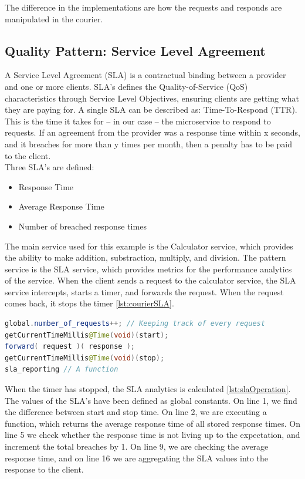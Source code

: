 \documentclass[12pt]{article}
\begin{document}
The difference in the implementations are how the requests and responds are manipulated in the courier.

\subsection{Quality Pattern: Service Level Agreement}
A Service Level Agreement (SLA) \cite{SLA:1} is a contractual binding between a provider and one or more clients. SLA's defines the Quality-of-Service (QoS) \cite{QoS:1} characteristics through Service Level Objectives, ensuring clients are getting what they are paying for. A single SLA can be described as: Time-To-Respond (TTR). This is the time it takes for -- in our case -- the microservice to respond to requests. If an agreement from the provider was a response time within x seconds, and it breaches for more than y times per month, then a penalty has to be paid to the client. \\

Three SLA's are defined:
\begin{itemize}
    \item Response Time
    \item Average Response Time
    \item Number of breached response times
\end{itemize}

The main service used for this example is the Calculator service, which provides the ability to make addition, substraction, multiply, and division. The pattern service is the SLA service, which provides metrics for the performance analytics of the service. When the client sends a request to the calculator service, the SLA service intercepts, starts a timer, and forwards the request. When the request comes back, it stops the timer \ref{lst:courierSLA}. 

\begin{lstlisting}[caption=Courier operations for the SLA service, 
captionpos=b, language=java, label=courierSLA, frame=single]
global.number_of_requests++; // Keeping track of every request
getCurrentTimeMillis@Time(void)(start);
forward( request )( response );
getCurrentTimeMillis@Time(void)(stop);
sla_reporting // A function
\end{lstlisting}

When the timer has stopped, the SLA analytics is calculated \ref{lst:slaOperation}. The values of the SLA's have been defined as global constants. On line 1, we find the difference between start and stop time. On line 2, we are executing a function, which returns the average response time of all stored response times. On line 5 we check whether the response time is not living up to the expectation, and increment the total breaches by 1. On line 9, we are checking the average response time, and on line 16 we are aggregating the SLA values into the response to the client. 
\end{document}
